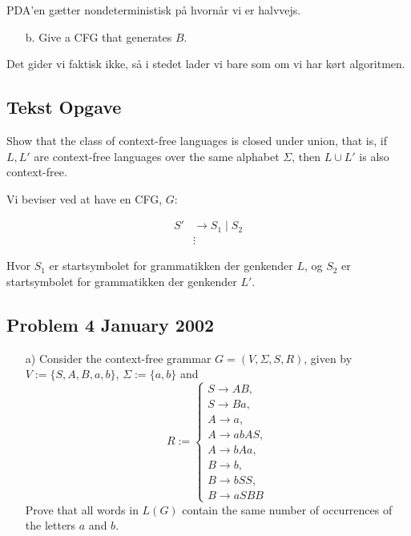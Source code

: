 PDA'en gætter nondeterministisk på hvornår vi er halvvejs.

\begin{enumerate}
	\item[b.] Give a CFG that generates $B$.
\end{enumerate}

Det gider vi faktisk ikke, så i stedet lader vi bare som om vi har kørt algoritmen.\\


\noindent
\subsection*{Tekst Opgave}
\noindent
Show that the class of context-free languages is closed under union, that is, if $L, L'$ are context-free languages over the same alphabet $\Sigma$, then $L \cup L'$ is also context-free.

Vi beviser ved at have en CFG, $G$:

\begin{equation*}
	\begin{split}
		S' &\rightarrow S_{1} \; | \; S_{2}\\
		&\vdots
	\end{split}
\end{equation*}

Hvor $S_{1}$ er startsymbolet for grammatikken der genkender $L$, og $S_{2}$ er startsymbolet for grammatikken der genkender $L'$.\\


\noindent
\subsection*{Problem 4 January 2002}
\noindent
\begin{enumerate}
	\item[a)] Consider the context-free grammar \( G = (V, \Sigma, S, R) \), given by
		\( V := \{S, A, B, a, b\} \), \( \Sigma := \{a, b\} \) and
		\[
			R := \left\{
			\begin{array}{l}
				S \to AB,   \\
				S \to Ba,   \\
				A \to a,    \\
				A \to abAS, \\
				A \to bAa,  \\
				B \to b,    \\
				B \to bSS,  \\
				B \to aSBB
			\end{array}
			\right.
		\]
		Prove that all words in \( L(G) \) contain the same number of occurrences of the letters \( a \) and \( b \).
\end{enumerate}

